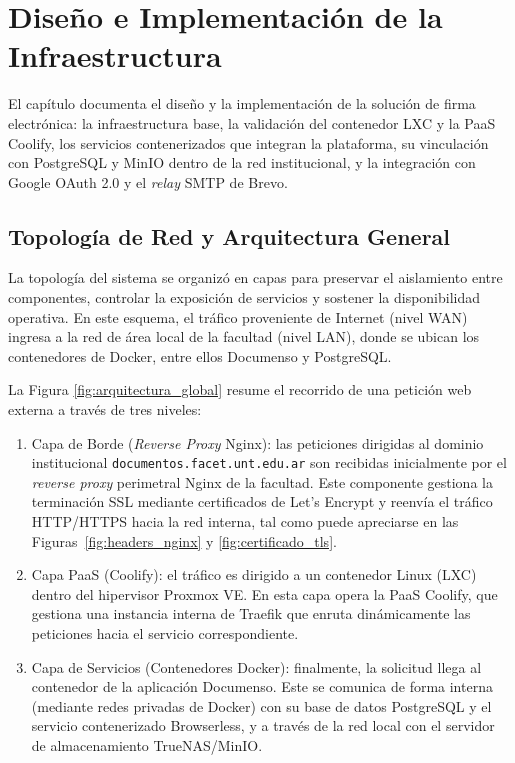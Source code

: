 \chapter{Diseño e Implementación de la Infraestructura}
\label{chap:diseno_implementacion}

El capítulo documenta el diseño y la implementación de la solución de firma electrónica: la infraestructura base, la validación del contenedor LXC y la PaaS Coolify, los servicios contenerizados que integran la plataforma, su vinculación con PostgreSQL y MinIO dentro de la red institucional, y la integración con Google OAuth 2.0 y el \textit{relay} SMTP de Brevo.

\section{Topología de Red y Arquitectura General}
\label{sec:topologia_arquitectura}

La topología del sistema se organizó en capas para preservar el aislamiento entre componentes, controlar la exposición de servicios y sostener la disponibilidad operativa. En este esquema, el tráfico proveniente de Internet (nivel WAN) ingresa a la red de área local de la facultad (nivel LAN), donde se ubican los contenedores de Docker, entre ellos Documenso y PostgreSQL.

La Figura \ref{fig:arquitectura_global} resume el recorrido de una petición web externa a través de tres niveles:

\begin{enumerate}
    \item Capa de Borde (\textit{Reverse Proxy} Nginx): las peticiones dirigidas al dominio institucional \nolinkurl{documentos.facet.unt.edu.ar} son recibidas inicialmente por el \textit{reverse proxy} perimetral Nginx de la facultad. Este componente gestiona la terminación SSL mediante certificados de Let's Encrypt y reenvía el tráfico HTTP/HTTPS hacia la red interna, tal como puede apreciarse en las Figuras~\ref{fig:headers_nginx} y \ref{fig:certificado_tls}.
    \item Capa PaaS (Coolify): el tráfico es dirigido a un contenedor Linux (LXC) dentro del hipervisor Proxmox VE. En esta capa opera la PaaS Coolify, que gestiona una instancia interna de Traefik que enruta dinámicamente las peticiones hacia el servicio correspondiente.
    \item Capa de Servicios (Contenedores Docker): finalmente, la solicitud llega al contenedor de la aplicación Documenso. Este se comunica de forma interna (mediante redes privadas de Docker) con su base de datos PostgreSQL y el servicio contenerizado Browserless, y a través de la red local con el servidor de almacenamiento TrueNAS/MinIO.
\end{enumerate}

